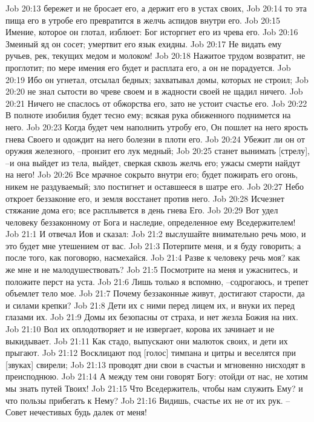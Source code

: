 Job 20:13  бережет и не бросает его, а держит его в устах своих,
Job 20:14  то эта пища его в утробе его превратится в желчь аспидов внутри его.
Job 20:15  Имение, которое он глотал, изблюет: Бог исторгнет его из чрева его.
Job 20:16  Змеиный яд он сосет; умертвит его язык ехидны.
Job 20:17  Не видать ему ручьев, рек, текущих медом и молоком!
Job 20:18  Нажитое трудом возвратит, не проглотит; по мере имения его будет и расплата его, а он не порадуется.
Job 20:19  Ибо он угнетал, отсылал бедных; захватывал домы, которых не строил;
Job 20:20  не знал сытости во чреве своем и в жадности своей не щадил ничего.
Job 20:21  Ничего не спаслось от обжорства его, зато не устоит счастье его.
Job 20:22  В полноте изобилия будет тесно ему; всякая рука обиженного поднимется на него.
Job 20:23  Когда будет чем наполнить утробу его, Он пошлет на него ярость гнева Своего и одождит на него болезни в плоти его.
Job 20:24  Убежит ли он от оружия железного, --пронзит его лук медный;
Job 20:25  станет вынимать [стрелу], --и она выйдет из тела, выйдет, сверкая сквозь желчь его; ужасы смерти найдут на него!
Job 20:26  Все мрачное сокрыто внутри его; будет пожирать его огонь, никем не раздуваемый; зло постигнет и оставшееся в шатре его.
Job 20:27  Небо откроет беззаконие его, и земля восстанет против него.
Job 20:28  Исчезнет стяжание дома его; все расплывется в день гнева Его.
Job 20:29  Вот удел человеку беззаконному от Бога и наследие, определенное ему Вседержителем!
Job 21:1  И отвечал Иов и сказал:
Job 21:2  выслушайте внимательно речь мою, и это будет мне утешением от вас.
Job 21:3  Потерпите меня, и я буду говорить; а после того, как поговорю, насмехайся.
Job 21:4  Разве к человеку речь моя? как же мне и не малодушествовать?
Job 21:5  Посмотрите на меня и ужаснитесь, и положите перст на уста.
Job 21:6  Лишь только я вспомню, --содрогаюсь, и трепет объемлет тело мое.
Job 21:7  Почему беззаконные живут, достигают старости, да и силами крепки?
Job 21:8  Дети их с ними перед лицем их, и внуки их перед глазами их.
Job 21:9  Домы их безопасны от страха, и нет жезла Божия на них.
Job 21:10  Вол их оплодотворяет и не извергает, корова их зачинает и не выкидывает.
Job 21:11  Как стадо, выпускают они малюток своих, и дети их прыгают.
Job 21:12  Восклицают под [голос] тимпана и цитры и веселятся при [звуках] свирели;
Job 21:13  проводят дни свои в счастьи и мгновенно нисходят в преисподнюю.
Job 21:14  А между тем они говорят Богу: отойди от нас, не хотим мы знать путей Твоих!
Job 21:15  Что Вседержитель, чтобы нам служить Ему? и что пользы прибегать к Нему?
Job 21:16  Видишь, счастье их не от их рук. --Совет нечестивых будь далек от меня!
